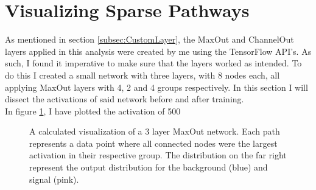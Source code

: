 \section{Visualizing Sparse Pathways}
As mentioned in section \ref{subsec:CustomLayer}, the MaxOut and ChannelOut layers applied in this 
analysis were created by me using the TensorFlow \ac{API}'s. As such, I found it imperative to make
sure that the layers worked as intended. To do this I created a small network with three layers, with 8 
nodes each, all applying MaxOut layers with 4, 2 and 4 groups respectively. In this section I will 
dissect the activations of said network before and after training.
\\
In figure \ref{fig:BTraining}, I have plotted the activation of 500
\begin{figure}
    \caption{A calculated visualization of a 3 layer MaxOut network. Each path 
    represents a data point where all connected nodes were the largest activation in their respective 
    group. The distribution on the far right represent the output distribution for the background (blue)
    and signal (pink).
    }
    \label{fig:BTraining}
\end{figure}
